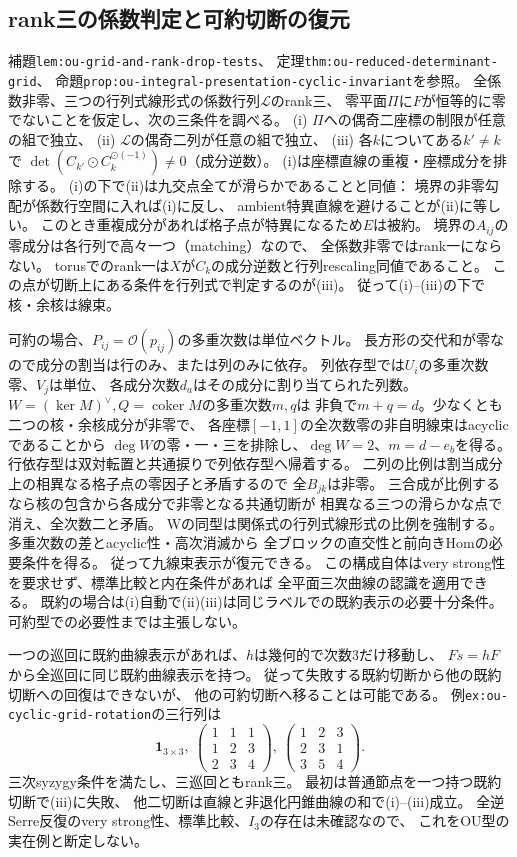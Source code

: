 \documentclass[11pt,a4paper]{ltjsarticle}
\begin{document}
\subsection*{rank三の係数判定と可約切断の復元}
補題\texttt{lem:ou-grid-and-rank-drop-tests}、
定理\texttt{thm:ou-reduced-determinant-grid}、
命題\texttt{prop:ou-integral-presentation-cyclic-invariant}を参照。
全係数非零、三つの行列式線形式の係数行列$\mathcal L$のrank三、
零平面$\Pi$に$F$が恒等的に零でないことを仮定し、次の三条件を調べる。
(i) $\Pi$への偶奇二座標の制限が任意の組で独立、
(ii) $\mathcal L$の偶奇二列が任意の組で独立、
(iii) 各$k$についてある$k'\ne k$で
$\det(C_{k'}\odot C_k^{\odot(-1)})\ne0$（成分逆数）。
(i)は座標直線の重複・座標成分を排除する。
(i)の下で(ii)は九交点全てが滑らかであることと同値：
境界の非零勾配が係数行空間に入れば(i)に反し、
ambient特異直線を避けることが(ii)に等しい。
このとき重複成分があれば格子点が特異になるため$E$は被約。
境界の$A_{ij}$の零成分は各行列で高々一つ（matching）なので、
全係数非零ではrank一にならない。
torusでのrank一は$X$が$C_k$の成分逆数と行列rescaling同値であること。
この点が切断上にある条件を行列式で判定するのが(iii)。
従って(i)--(iii)の下で核・余核は線束。

可約の場合、$P_{ij}=\mathcal O(p_{ij})$の多重次数は単位ベクトル。
長方形の交代和が零なので成分の割当は行のみ、または列のみに依存。
列依存型では$U_i$の多重次数零、$V_j$は単位、
各成分次数$d_a$はその成分に割り当てられた列数。
$W=(\ker M)^\vee,Q=\operatorname{coker}M$の多重次数$m,q$は
非負で$m+q=d$。少なくとも二つの核・余核成分が非零で、
各座標$[-1,1]$の全次数零の非自明線束はacyclicであることから
$\deg W$の零・一・三を排除し、$\deg W=2$、$m=d-e_b$を得る。
行依存型は双対転置と共通捩りで列依存型へ帰着する。
二列の比例は割当成分上の相異なる格子点の零因子と矛盾するので
全$B_{jk}$は非零。
三合成が比例するなら核の包含から各成分で非零となる共通切断が
相異なる三つの滑らかな点で消え、全次数二と矛盾。
Wの同型は関係式の行列式線形式の比例を強制する。
多重次数の差とacyclic性・高次消滅から
全ブロックの直交性と前向きHomの必要条件を得る。
従って九線束表示が復元できる。
この構成自体はvery strong性を要求せず、標準比較と内在条件があれば
全平面三次曲線の認識を適用できる。
既約の場合は(i)自動で(ii)(iii)は同じラベルでの既約表示の必要十分条件。
可約型での必要性までは主張しない。

一つの巡回に既約曲線表示があれば、$h$は幾何的で次数3だけ移動し、
$Fs=hF$から全巡回に同じ既約曲線表示を持つ。
従って失敗する既約切断から他の既約切断への回復はできないが、
他の可約切断へ移ることは可能である。
例\texttt{ex:ou-cyclic-grid-rotation}の三行列は
\[
 \mathbf1_{3\times3},\
 \begin{pmatrix}1&1&1\\1&2&3\\2&3&4\end{pmatrix},\
 \begin{pmatrix}1&2&3\\2&3&1\\3&5&4\end{pmatrix}.
\]
三次syzygy条件を満たし、三巡回ともrank三。
最初は普通節点を一つ持つ既約切断で(iii)に失敗、
他二切断は直線と非退化円錐曲線の和で(i)--(iii)成立。
全逆Serre反復のvery strong性、標準比較、$I_3$の存在は未確認なので、
これをOU型の実在例と断定しない。
\end{document}
